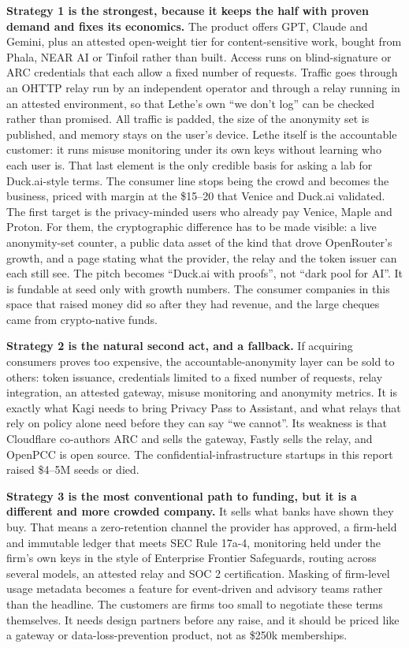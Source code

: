 \documentclass[10pt,a4paper]{article}
\begin{document}
\textbf{Strategy 1 is the strongest, because it keeps the half with proven demand and fixes its economics.} The product offers GPT, Claude and Gemini, plus an attested open-weight tier for content-sensitive work, bought from Phala, NEAR AI or Tinfoil rather than built. Access runs on blind-signature or ARC credentials that each allow a fixed number of requests. Traffic goes through an OHTTP relay run by an independent operator and through a relay running in an attested environment, so that Lethe's own ``we don't log'' can be checked rather than promised. All traffic is padded, the size of the anonymity set is published, and memory stays on the user's device. Lethe itself is the accountable customer: it runs misuse monitoring under its own keys without learning who each user is. That last element is the only credible basis for asking a lab for Duck.ai-style terms. The consumer line stops being the crowd and becomes the business, priced with margin at the \$15--20 that Venice and Duck.ai validated. The first target is the privacy-minded users who already pay Venice, Maple and Proton. For them, the cryptographic difference has to be made visible: a live anonymity-set counter, a public data asset of the kind that drove OpenRouter's growth, and a page stating what the provider, the relay and the token issuer can each still see. The pitch becomes ``Duck.ai with proofs'', not ``dark pool for AI''. It is fundable at seed only with growth numbers. The consumer companies in this space that raised money did so after they had revenue, and the large cheques came from crypto-native funds.

\textbf{Strategy 2 is the natural second act, and a fallback.} If acquiring consumers proves too expensive, the accountable-anonymity layer can be sold to others: token issuance, credentials limited to a fixed number of requests, relay integration, an attested gateway, misuse monitoring and anonymity metrics. It is exactly what Kagi needs to bring Privacy Pass to Assistant, and what relays that rely on policy alone need before they can say ``we cannot''. Its weakness is that Cloudflare co-authors ARC and sells the gateway, Fastly sells the relay, and OpenPCC is open source. The confidential-infrastructure startups in this report raised \$4--5M seeds or died.

\textbf{Strategy 3 is the most conventional path to funding, but it is a different and more crowded company.} It sells what banks have shown they buy. That means a zero-retention channel the provider has approved, a firm-held and immutable ledger that meets SEC Rule 17a-4, monitoring held under the firm's own keys in the style of Enterprise Frontier Safeguards, routing across several models, an attested relay and SOC 2 certification. Masking of firm-level usage metadata becomes a feature for event-driven and advisory teams rather than the headline. The customers are firms too small to negotiate these terms themselves. It needs design partners before any raise, and it should be priced like a gateway or data-loss-prevention product, not as \$250k memberships.
\end{document}
